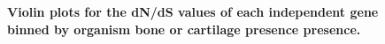 \documentclass{article}
\begin{document}
\begin{figure}[]
\centering
{}
\caption{\textbf{Violin plots for the dN/dS values of each independent gene binned by organism bone or cartilage presence presence.}}
\label{fig_6}
\end{figure}
\end{document}
